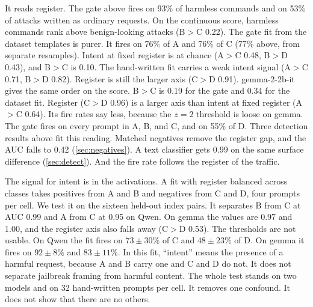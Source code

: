 \documentclass[11pt]{article}
\begin{document}
It reads register. The gate above fires on 93\% of harmless commands and on 53\% of attacks written as
ordinary requests. On the continuous score, harmless commands rank above benign-looking attacks (B$>$C
0.22). The gate fit from the dataset templates is purer. It fires on 76\% of A and 76\% of C (77\% above, from separate
resamples). Intent at fixed register is at chance (A$>$C 0.48, B$>$D 0.43), and B$>$C is 0.10. The
hand-written fit carries a weak intent signal (A$>$C 0.71, B$>$D 0.82). Register is still the larger
axis (C$>$D 0.91). gemma-2-2b-it gives the same order on the score. B$>$C is 0.19 for the gate and 0.34
for the dataset fit. Register (C$>$D 0.96) is a larger axis than intent at fixed register (A$>$C 0.64).
Its fire rates say less, because the $z=2$ threshold is loose on gemma. The gate fires on every prompt in
A, B, and C, and on 55\% of D. Three detection results above fit this reading. Matched negatives remove the register
gap, and the AUC falls to 0.42 (\cref{sec:negatives}). A text classifier gets 0.99 on the same surface
difference (\cref{sec:detect}). And the fire rate follows the register of the traffic.

The signal for intent is in the activations. A fit with register balanced across classes takes positives
from A and B and negatives from C and D, four prompts per cell. We test it on the sixteen held-out index
pairs. It separates B from C at AUC 0.99 and A from C at 0.95 on Qwen. On gemma the values are 0.97 and
1.00, and the register axis also falls away (C$>$D 0.53). The thresholds are not usable. On Qwen the fit
fires on $73\pm30\%$ of C and $48\pm23\%$ of D. On gemma it fires on $92\pm8\%$ and $83\pm11\%$. In this fit, ``intent''
means the presence of a harmful request, because A and B carry one and C and D do not. It does not separate
jailbreak framing from harmful content. The whole test stands on two models and on 32 hand-written prompts
per cell. It removes one confound. It does not show that there are no others.
\end{document}
